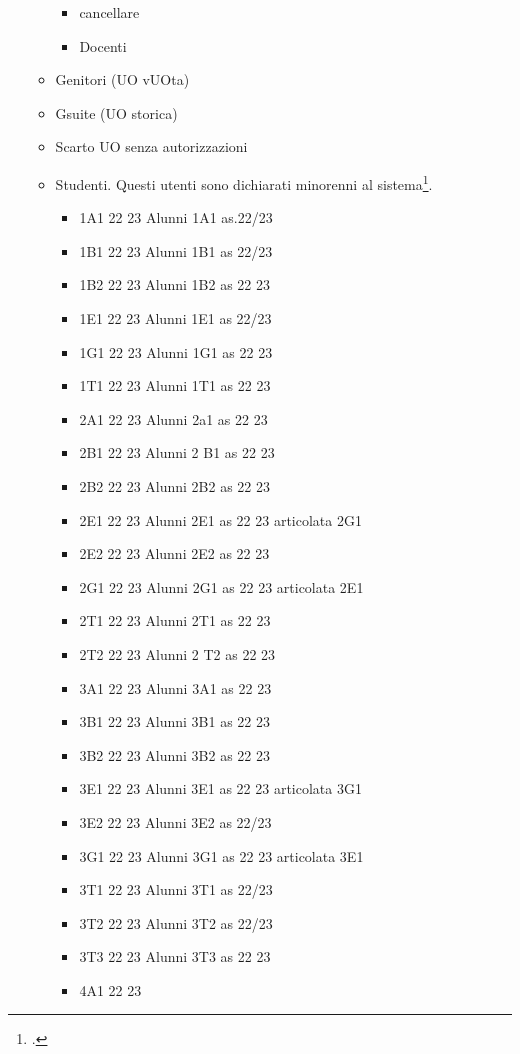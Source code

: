 \begin{itemize}
\begin{itemize}
\begin{itemize}
	\item cancellare
	\item Docenti
\end{itemize}
\item Genitori (UO vUOta)
\item Gsuite (UO storica)
\item Scarto UO senza autorizzazioni
\item Studenti. Questi utenti sono dichiarati minorenni al sistema\footcite{Google2021b}.
\begin{itemize}
	\item 1A1 22 23
	Alunni 1A1 as.22/23
	\item 1B1 22 23
	Alunni 1B1 as 22/23
	\item 1B2 22 23
	Alunni 1B2 as 22 23
	\item 1E1 22 23
	Alunni 1E1 as 22/23	
	\item 1G1 22 23
	Alunni 1G1 as 22 23	
	\item 1T1 22 23
	Alunni 1T1 as 22 23	
	\item 2A1 22 23
	Alunni 2a1 as 22 23	
	\item 2B1 22 23
	Alunni 2 B1 as 22 23	
	\item 2B2 22 23
	Alunni 2B2 as 22 23	
	\item 2E1 22 23
	Alunni 2E1 as 22 23 articolata 2G1	
	\item 2E2 22 23
	Alunni 2E2 as 22 23	
	\item 2G1 22 23
	Alunni 2G1 as 22 23 articolata 2E1	
	\item 2T1 22 23
	Alunni 2T1 as 22 23	
	\item 2T2 22 23
	Alunni 2 T2 as 22 23	
	\item 3A1 22 23
	Alunni 3A1 as 22 23	
	\item 3B1 22 23
	Alunni 3B1 as 22 23	
	\item 3B2 22 23
	Alunni 3B2 as 22 23	
	\item 3E1 22 23
	Alunni 3E1 as 22 23 articolata 3G1	
	\item 3E2 22 23
	Alunni 3E2 as 22/23	
	\item 3G1 22 23
	Alunni 3G1 as 22 23 articolata 3E1	
	\item 3T1 22 23
	Alunni 3T1 as 22/23	
	\item 3T2 22 23
	Alunni 3T2 as 22/23	
	\item 3T3 22 23
	Alunni 3T3 as 22 23	
	\item 4A1 22 23

\end{itemize}
\end{itemize}
\end{itemize}
